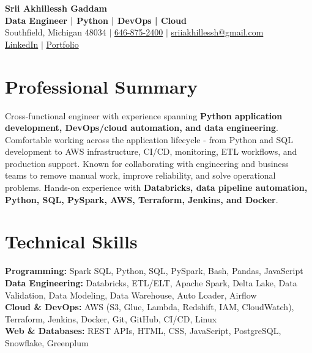 \documentclass[letterpaper,10pt]{article}
\begin{document}
\fontsize{9.35pt}{10.45pt}\selectfont

\begin{center}
    {\LARGE \textbf{Srii Akhillessh Gaddam}} \\[-1pt]
    \textbf{Data Engineer | Python | DevOps | Cloud} \\[2pt]
    Southfield, Michigan 48034 $|$
    \href{tel:6468752400}{646-875-2400} $|$
    \href{mailto:sriiakhillessh@gmail.com}{sriiakhillessh@gmail.com} \\[1pt]
    \href{https://www.linkedin.com/in/srii-akhiilessh-gaddam-b48668191/}{LinkedIn} $|$
    \href{https://sriiakhillesshg.github.io/portfolio/}{Portfolio}
\end{center}
\vspace{-8pt}

\section{Professional Summary}
\small{Cross-functional engineer with experience spanning \textbf{Python application development, DevOps/cloud automation, and data engineering}. Comfortable working across the application lifecycle - from Python and SQL development to AWS infrastructure, CI/CD, monitoring, ETL workflows, and production support. Known for collaborating with engineering and business teams to remove manual work, improve reliability, and solve operational problems. Hands-on experience with \textbf{Databricks, data pipeline automation, Python, SQL, PySpark, AWS, Terraform, Jenkins, and Docker}.}

\section{Technical Skills}
\small{
\textbf{Programming:} Spark SQL, Python, SQL, PySpark, Bash, Pandas, JavaScript \\
\textbf{Data Engineering:} Databricks, ETL/ELT, Apache Spark, Delta Lake, Data Validation, Data Modeling, Data Warehouse, Auto Loader, Airflow \\
\textbf{Cloud \& DevOps:} AWS (S3, Glue, Lambda, Redshift, IAM, CloudWatch), Terraform, Jenkins, Docker, Git, GitHub, CI/CD, Linux \\
\textbf{Web \& Databases:} REST APIs, HTML, CSS, JavaScript, PostgreSQL, Snowflake, Greenplum
}
\end{document}
